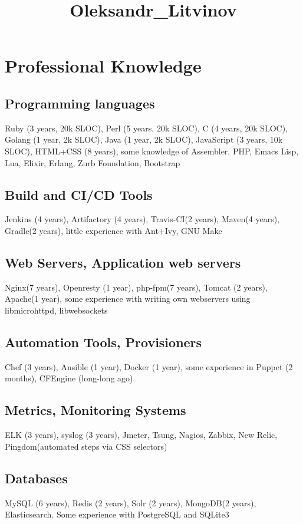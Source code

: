 \documentclass[letterpaper]{article}
\date{}
\title{Oleksandr\_Litvinov}
\renewcommand\maketitle{}
\begin{document}
\maketitle
{}

\section{Professional Knowledge}
\label{sec-1}
\subsection{Programming languages}
\label{sec-1-1}
Ruby (3 years, 20k SLOC), Perl (5 years, 20k SLOC), C (4 years, 20k SLOC), Golang (1 year, 2k SLOC), Java (1 year, 2k SLOC), JavaScript (3 years, 10k SLOC), HTML+CSS (8 years), some knowledge of Assembler, PHP, Emacs Lisp, Lua, Elixir, Erlang, Zurb Foundation, Bootstrap
\subsection{Build and CI/CD Tools}
\label{sec-1-2}
Jenkins (4 years), Artifactory (4 years), Travis-CI(2 years), Maven(4 years), Gradle(2 years), little experience with Ant+Ivy, GNU Make
\subsection{Web Servers, Application web servers}
\label{sec-1-3}
Nginx(7 years), Openresty (1 year), php-fpm(7 years), Tomcat (2 years), Apache(1 year), some experience with writing own webservers using libmicrohttpd, libwebsockets
\subsection{Automation Tools, Provisioners}
\label{sec-1-4}
Chef (3 years), Ansible (1 year), Docker (1 year), some experience in Puppet (2 months), CFEngine (long-long ago)
\subsection{Metrics, Monitoring Systems}
\label{sec-1-5}
ELK (3 years), syslog (3 years), Jmeter, Tsung, Nagios, Zabbix, New Relic, Pingdom(automated steps via CSS selectors)
\subsection{Databases}
\label{sec-1-6}
MySQL (6 years), Redis (2 years), Solr (2 years), MongoDB(2 years), Elasticsearch. Some experience with PostgreSQL and SQLite3
\end{document}
